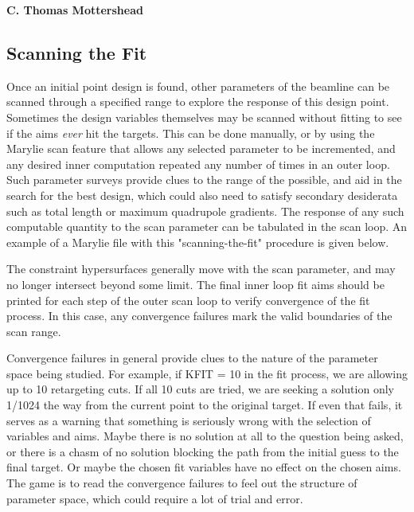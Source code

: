 \documentclass[11pt]{article} %
\newcommand{\sub}{\subsection}
\begin{document}
\begin{center}  {\bf C. Thomas Mottershead }

\sub{Scanning the Fit}
Once an initial point design is found,
other parameters of the beamline can be scanned through a specified range to explore the response of this design point.
 Sometimes the design variables themselves may be scanned without fitting to see if the aims {\it ever} hit the targets.
 This can be done manually, or by using the Marylie scan feature that allows any selected parameter to be incremented, and any desired inner computation repeated any number of times in an outer loop. Such parameter surveys provide clues to the range of the possible, and aid in the search for the best design, which could also need to satisfy secondary desiderata such as total length or maximum quadrupole gradients. The response of any such computable quantity to the scan parameter can be tabulated in the scan loop. An example of a Marylie file with this "scanning-the-fit" procedure is given below.

 The constraint hypersurfaces generally move with the scan parameter, and may no longer intersect beyond some limit. The final inner loop fit aims should be printed for each step of the outer scan loop to verify convergence of the fit process. In this case, any convergence failures mark the valid boundaries of the scan range.

 Convergence failures in general provide clues to the nature of the parameter space being studied. For example, if KFIT = 10 in the fit process, we are allowing up to 10 retargeting cuts. If all 10 cuts are tried, we are seeking a solution only 1/1024 the way from the current point to the original target. If even that fails, it serves as a warning that something is seriously wrong with the selection of variables and aims. Maybe there is no solution at all to the question being asked, or there is a chasm of no solution blocking the path from the initial guess to the final target. Or maybe the chosen fit variables have no effect on the chosen aims. The game is to read the convergence failures to feel out the structure of parameter space, which could require a lot of trial and error.




\end{center}
\end{document}
